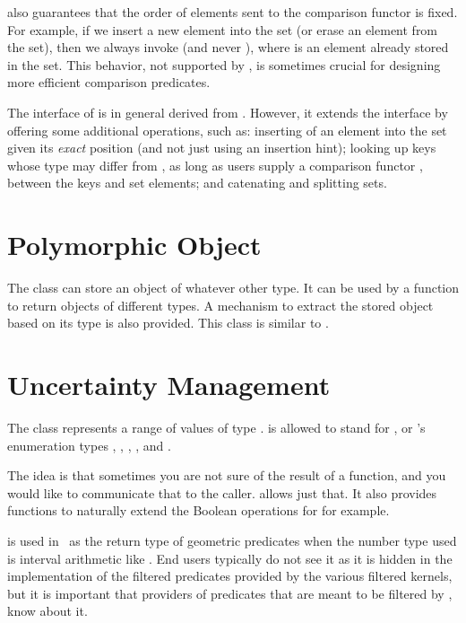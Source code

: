  also guarantees that the order of
elements sent to the comparison functor is fixed. For example, if we insert
a new element  into the set (or erase an element from the set), then
we always invoke  (and never ),
where  is an element already stored in the set. This behavior, not
supported by , is sometimes crucial for designing more
efficient comparison predicates.


The interface of  is in general
derived from . However, it extends the interface by
offering some additional operations, such as: inserting of an element into
the set given its {\em exact} position (and not just using an insertion hint);
looking up keys whose type may differ from , as long as users supply
a comparison functor , between the keys and set elements;
and catenating and splitting sets.

\section{Polymorphic Object}

The class  can store an object of whatever other type.
It can be used by a function to return objects of different types.
A mechanism to extract the stored object based on its type is also provided.
This class is similar to .

\section{Uncertainty Management}

The class  represents a range of values of type .
 is allowed to stand for , or \cgal's enumeration types
, , , ,
 and .

The idea is that sometimes you are not sure of the result of a function,
and you would like to communicate that to the caller.  
allows just that.  It also provides functions to naturally extend the
Boolean operations for  for example.

 is used in \cgal\ as the return type of geometric predicates
when the number type used is interval arithmetic like .
End users typically do not see it as it is hidden in the implementation
of the filtered predicates provided by the various filtered kernels,
but it is important that providers of predicates that are meant to be
filtered by , know about it.

